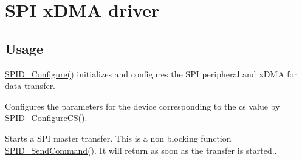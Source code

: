 \hypertarget{group__spi__dma__module}{}\section{S\+PI x\+D\+MA driver}
\label{group__spi__dma__module}
\hypertarget{group__RTEMSBSPsARM_Usage}{}\subsection{Usage}\label{group__RTEMSBSPsARM_Usage}

\begin{DoxyItemize}
\item \mbox{\hyperlink{spi__dma_8c_a46701ce9101e2fe7f1235c16cd74bab3}{S\+P\+I\+D\+\_\+\+Configure()}} initializes and configures the S\+PI peripheral and x\+D\+MA for data transfer. 
\item Configures the parameters for the device corresponding to the cs value by \mbox{\hyperlink{spi__dma_8c_a36e110a3cda7abf52985f30626c47b5f}{S\+P\+I\+D\+\_\+\+Configure\+C\+S()}}.  
\item Starts a S\+PI master transfer. This is a non blocking function \mbox{\hyperlink{spi__dma_8c_ae3c774fb7e4bcf2db4e5d9e8891b6abd}{S\+P\+I\+D\+\_\+\+Send\+Command()}}. It will return as soon as the transfer is started.. 
\end{DoxyItemize}